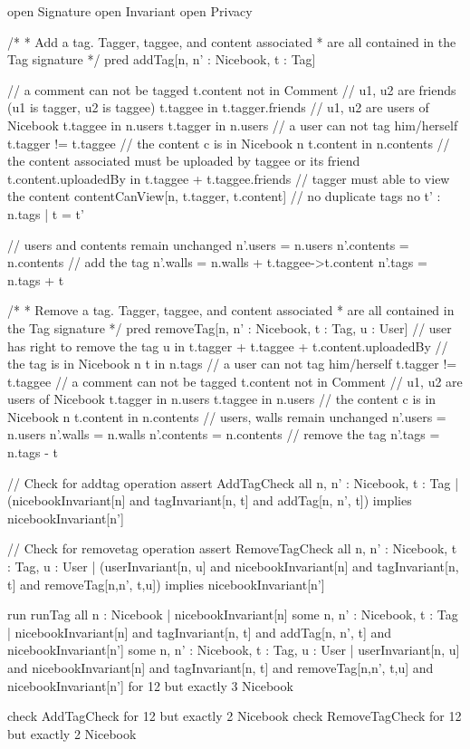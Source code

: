\documentclass[titlepage]{article}
\begin{document}
\begin{alloy}
open Signature
open Invariant
open Privacy

/*
*	Add a tag. Tagger, taggee, and content associated
*	are all contained in the Tag signature
*/
pred addTag[n, n' : Nicebook, t : Tag] {
    // a comment can not be tagged
    t.content not in Comment
    // u1, u2 are friends (u1 is tagger, u2 is taggee)
    t.taggee in t.tagger.friends
    // u1, u2 are users of Nicebook
    t.taggee in n.users
    t.tagger in n.users
    // a user can not tag him/herself
    t.tagger != t.taggee
    // the content c is in Nicebook n
    t.content in n.contents
    // the content associated must be uploaded by taggee or its friend
    t.content.uploadedBy in t.taggee + t.taggee.friends
    // tagger must able to view the content 
    contentCanView[n, t.tagger, t.content]
    // no duplicate tags
    no t' : n.tags | t = t'
    
    // users and contents remain unchanged
    n'.users = n.users
    n'.contents = n.contents
    // add the tag
    n'.walls = n.walls + t.taggee->t.content
    n'.tags = n.tags + t
}

/*
*	Remove a tag. Tagger, taggee, and content associated
*	are all contained in the Tag signature
*/
pred removeTag[n, n' : Nicebook, t : Tag, u : User]{
    // user has right to remove the tag
    u in t.tagger + t.taggee + t.content.uploadedBy
    // the tag is in Nicebook n
    t in n.tags
    // a user can not tag him/herself
    t.tagger != t.taggee
    // a comment can not be tagged
    t.content not in Comment
    // u1, u2 are users of Nicebook
    t.tagger in n.users 
    t.taggee in n.users
    // the content c is in Nicebook n
    t.content in n.contents
    // users, walls remain unchanged
    n'.users = n.users
    n'.walls = n.walls
    n'.contents = n.contents
    // remove the tag
    n'.tags = n.tags - t
}

// Check for addtag operation
assert AddTagCheck {
    all n, n' : Nicebook, t : Tag | 
        (nicebookInvariant[n] and tagInvariant[n, t] and addTag[n, n', t]) implies 
            nicebookInvariant[n']
} 

// Check for removetag operation
assert RemoveTagCheck {
    all n, n' : Nicebook, t : Tag, u : User | 
        (userInvariant[n, u] and nicebookInvariant[n] and tagInvariant[n, t] and 
            removeTag[n,n', t,u]) implies nicebookInvariant[n']
}

run runTag {
    all n : Nicebook | nicebookInvariant[n]
    some n, n' : Nicebook, t : Tag | 
        nicebookInvariant[n] and tagInvariant[n, t] and 
            addTag[n, n', t] and nicebookInvariant[n']
    some n, n' : Nicebook, t : Tag, u : User | 
        userInvariant[n, u] and nicebookInvariant[n] and tagInvariant[n, t]
            and removeTag[n,n', t,u] and nicebookInvariant[n']
} for 12 but exactly 3 Nicebook

check AddTagCheck for 12 but exactly 2 Nicebook
check RemoveTagCheck for 12 but exactly 2 Nicebook   
\end{alloy}
\end{document}
